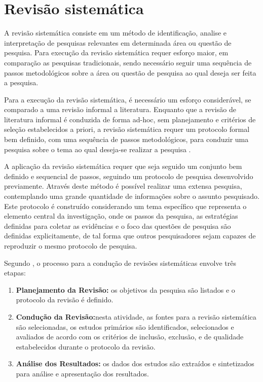 \label{chapter:correlatos}
\section{Revisão sistemática}
A revisão sistemática consiste em um método de identificação, analise e interpretação de pesquisas relevantes em determinada área ou questão de pesquisa. Para execução da revisão sistemática requer esforço maior, em comparação as pesquisas tradicionais, sendo necessário seguir uma sequência de passos metodológicos sobre a área ou questão de pesquisa ao qual deseja ser feita a pesquisa\cite{kitchenham2004procedures}.

Para a execução da revisão sistemática, é necessário um esforço considerável, se comparado a uma revisão informal a literatura. Enquanto que a revisão de literatura informal é conduzida de forma ad-hoc, sem planejamento e critérios de seleção estabelecidos a priori, a revisão sistemática requer um protocolo formal bem definido, com uma sequência de passos metodológicos, para conduzir uma pesquisa sobre o tema ao qual deseja-se realizar a pesquisa \cite{MafraTravassos}.

A aplicação da revisão sistemática requer que seja seguido um conjunto bem definido e sequencial de passos, seguindo um protocolo de pesquisa desenvolvido previamente. Através deste método é possível realizar uma extensa pesquisa, contemplando uma grande quantidade de informações sobre o assunto pesquisado\cite{MafraTravassos}. Este protocolo é construído considerando um tema específico que representa o elemento central da investigação, onde os passos da pesquisa, as estratégias definidas para coletar as evidências e o foco das questões de pesquisa são definidas explicitamente, de tal forma que outros pesquisadores sejam capazes de reproduzir o mesmo protocolo de pesquisa\cite{biolchini2005systematic}.

Segundo \cite{MafraTravassos}, o processo para a condução de revisões sistemáticas envolve três etapas:
\begin{enumerate}
\item \textbf{Planejamento da Revisão:} os objetivos da pesquisa são listados e o protocolo da revisão é definido.
\item \textbf{Condução da Revisão:}nesta atividade, as fontes para a revisão sistemática são selecionadas, os estudos primários são identificados, selecionados e avaliados de acordo com os critérios de inclusão, exclusão, e de qualidade estabelecidos durante o protocolo da revisão.
\item \textbf{Análise dos Resultados:} os dados dos estudos são extraídos e sintetizados para análise e apresentação
dos resultados.
\end{enumerate}

